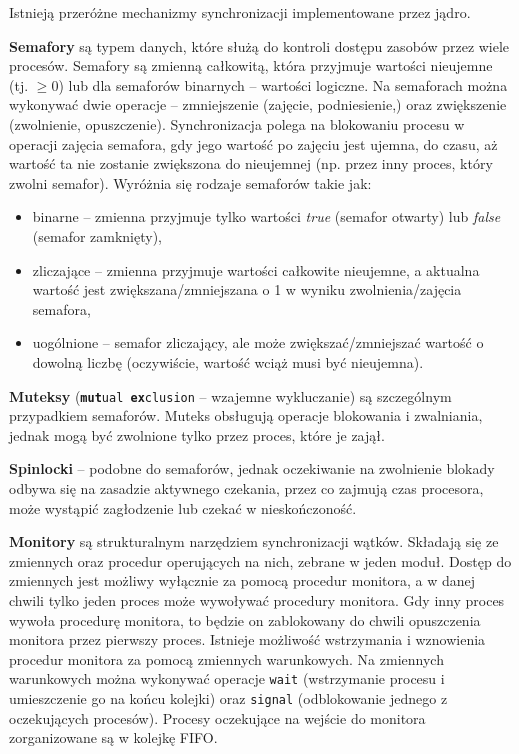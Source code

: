 Istnieją przeróżne mechanizmy synchronizacji implementowane przez jądro.

\textbf{Semafory} są typem danych, które służą do kontroli dostępu zasobów przez wiele procesów.
Semafory są zmienną całkowitą, która przyjmuje wartości nieujemne (tj. $\ge 0$) lub dla semaforów binarnych -- wartości logiczne.
Na semaforach można wykonywać dwie operacje -- zmniejszenie (zajęcie, podniesienie,) oraz zwiększenie (zwolnienie, opuszczenie).
Synchronizacja polega na blokowaniu procesu w operacji zajęcia semafora, gdy jego wartość po zajęciu jest ujemna, do czasu, aż wartość ta nie zostanie zwiększona do nieujemnej (np. przez inny proces, który zwolni semafor).
Wyróżnia się rodzaje semaforów takie jak:
\begin{itemize}
\item binarne -- zmienna przyjmuje tylko wartości \textit{true} (semafor otwarty) lub \textit{false} (semafor zamknięty),
\item zliczające -- zmienna przyjmuje wartości całkowite nieujemne, a aktualna wartość jest zwiększana/zmniejszana o 1 w wyniku zwolnienia/zajęcia semafora,
\item uogólnione -- semafor zliczający, ale może zwiększać/zmniejszać wartość o dowolną liczbę (oczywiście, wartość wciąż musi być nieujemna).
\end{itemize}

\textbf{Muteksy} (\texttt{\textbf{mut}ual \textbf{ex}clusion} -- wzajemne wykluczanie) są szczególnym przypadkiem semaforów. Muteks obsługują operacje blokowania i zwalniania, jednak mogą być zwolnione tylko przez proces, które je zajął.

\textbf{Spinlocki} -- podobne do semaforów, jednak oczekiwanie na zwolnienie blokady odbywa się na zasadzie aktywnego czekania, przez co zajmują czas procesora, może wystąpić zagłodzenie lub czekać w nieskończoność.

\textbf{Monitory} są strukturalnym narzędziem synchronizacji wątków. Składają się ze zmiennych oraz procedur operujących na nich, zebrane w jeden moduł. Dostęp do zmiennych jest możliwy wyłącznie za pomocą procedur monitora, a w danej chwili tylko jeden proces może wywoływać procedury monitora. Gdy inny proces wywoła procedurę monitora, to będzie on zablokowany do chwili opuszczenia monitora przez pierwszy proces. Istnieje możliwość wstrzymania i wznowienia procedur monitora za pomocą zmiennych warunkowych. Na zmiennych warunkowych można wykonywać operacje \texttt{wait} (wstrzymanie procesu i umieszczenie go na końcu kolejki) oraz \texttt{signal} (odblokowanie jednego z oczekujących procesów). Procesy oczekujące na wejście do monitora zorganizowane są w kolejkę FIFO.